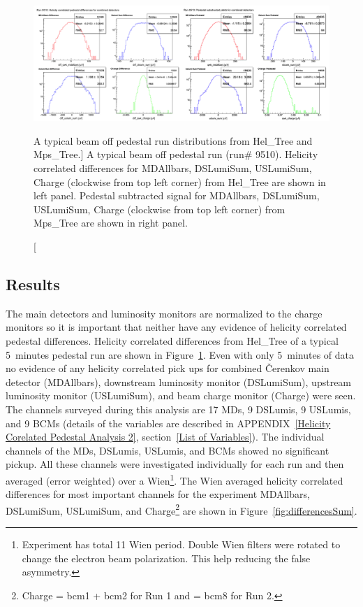 \begin{singlespace}
\begin{figure}[!h]
	\centering
	\begin{center}
	\includegraphics[width=15.0cm]{figures/run}
	\end{center}
	\caption
	[A typical beam off pedestal run distributions from Hel\_Tree and Mps\_Tree.]
	{A typical beam off pedestal run (run\# 9510). Helicity correlated differences for MDAllbars, DSLumiSum, USLumiSum, Charge (clockwise from top left corner) from Hel\_Tree are shown in left panel. Pedestal subtracted signal for MDAllbars, DSLumiSum, USLumiSum, Charge (clockwise from top left corner) from Mps\_Tree are shown in right panel.}
	\label{fig:run_hel_tree}
\end{figure}
\end{singlespace}


\subsection{Results}
\label{Results}
The main detectors and luminosity monitors are normalized to the charge monitors so it is important that neither have any evidence of helicity correlated pedestal differences. Helicity correlated differences from Hel\_Tree of a typical 5~minutes pedestal run are shown in Figure~\ref{fig:run_hel_tree}. Even with only 5~minutes of data no evidence of any helicity correlated pick ups for combined \v{C}erenkov main detector (MDAllbars), downstream luminosity monitor (DSLumiSum), upstream luminosity monitor (USLumiSum), and beam charge monitor (Charge) were seen. 
The channels surveyed during this analysis are 17 MDs, 9 DSLumis, 9 USLumis, and 9 BCMs (details of the variables are described in APPENDIX~\ref{Helicity Corelated Pedestal Analysis 2}, section~\ref{List of Variables}). The individual channels of the MDs, DSLumis, USLumis, and BCMs showed no significant pickup. All these channels were investigated individually for each run and then averaged (error weighted) over a Wien\footnote{Experiment has total 11 Wien period. Double Wien filters were rotated to change the electron beam polarization. This help reducing the false asymmetry.}.
The Wien averaged helicity correlated differences for most important channels for the experiment MDAllbars, DSLumiSum, USLumiSum, and Charge\footnote{Charge = bcm1 + bcm2 for Run 1 and = bcm8 for Run 2.} are shown in Figure~\ref{fig:differencesSum}. 

